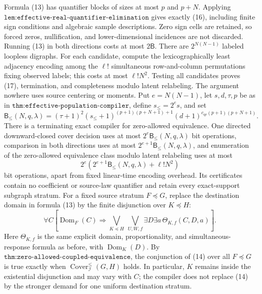 Formula (13) has quantifier blocks of sizes at most \(p\) and \(p+N\). Applying \(\texttt{lem:effective-real-quantifier-elimination}\) gives exactly (16), including finite sign conditions and algebraic sample descriptions. Zero sign cells are retained, so forced zeros, nullification, and lower-dimensional incidences are not discarded. Running (13) in both directions costs at most \(2\mathsf B\). There are \(2^{N(N-1)}\) labeled loopless digraphs. For each candidate, compute the lexicographically least adjacency encoding among the \(\ell!\) simultaneous row-and-column permutations fixing observed labels; this costs at most \(\ell!N^2\). Testing all candidates proves (17), termination, and completeness modulo latent relabeling. The argument nowhere uses source centering or moments.
Put \(e=N(N-1)\), let \(s,d,\tau,p\) be as in \(\texttt{thm:effective-population-compiler}\), define \(s_{\le}=2^e s\), and set
\[
\mathsf B_{\le}(N,q,\lambda)
=(\tau+1)^2(s_{\le}+1)^{(p+1)(p+N+1)+1}
(d+1)^{c_{\mathrm{qe}}(p+1)(p+N+1)}.
\]
There is a terminating exact compiler for zero-allowed equivalence. One directed downward-closed cover decision uses at most \(2^e\mathsf B_{\le}(N,q,\lambda)\) bit operations, comparison in both directions uses at most \(2^{e+1}\mathsf B_{\le}(N,q,\lambda)\), and enumeration of the zero-allowed equivalence class modulo latent relabeling uses at most
\[
2^e\left(2^{e+1}\mathsf B_{\le}(N,q,\lambda)+\ell!N^2\right)
\]
bit operations, apart from fixed linear-time encoding overhead. Its certificates contain no coefficient or source-law quantifier and retain every exact-support subgraph stratum.
For a fixed source stratum \(F\preceq G\), replace the destination domain in formula (13) by the finite disjunction over \(K\preceq H\):
\[
\forall C\left[
\operatorname{Dom}_F(C)\Longrightarrow
\bigvee_{K\preceq H}\ \bigvee_{U,W,f}
\exists D\exists a\,\Theta_{K,f}(C,D,a)
\right]. \tag{14}
\]
Here \(\Theta_{K,f}\) is the same explicit domain, proportionality, and simultaneous-response formula as before, with \(\operatorname{Dom}_K(D)\). By \(\texttt{thm:zero-allowed-coupled-equivalence}\), the conjunction of (14) over all \(F\preceq G\) is true exactly when \(\operatorname{Cover}^{\le}_{\mathcal I}(G,H)\) holds. In particular, \(K\) remains inside the existential disjunction and may vary with \(C\); the compiler does not replace (14) by the stronger demand for one uniform destination stratum.

